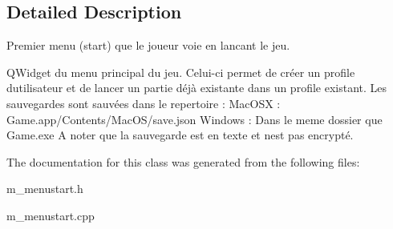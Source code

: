 \subsection{Detailed Description}
Premier menu (start) que le joueur voie en lancant le jeu. 

Q\+Widget du menu principal du jeu. Celui-\/ci permet de créer un profile d\textquotesingle{}utilisateur et de lancer un partie déjà existante dans un profile existant. Les sauvegardes sont sauvées dans le repertoire \+: Mac\+O\+S\+X \+: Game.\+app/\+Contents/\+Mac\+O\+S/save.json Windows \+: Dans le meme dossier que Game.\+exe A noter que la sauvegarde est en texte et n\textquotesingle{}est pas encrypté. 

The documentation for this class was generated from the following files\+:\begin{DoxyCompactItemize}
\item 
m\+\_\+menustart.\+h\item 
m\+\_\+menustart.\+cpp\end{DoxyCompactItemize}
